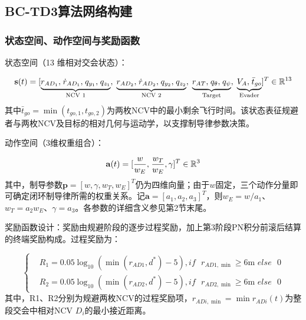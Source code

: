 \subsection{BC-TD3算法网络构建}
\subsubsection{状态空间、动作空间与奖励函数}
状态空间（13 维相对交会状态）：

\begin{equation}
\label{eq:72}
{\mathbf{s}}(t) = {[\underbrace {{r_{A{D_1}}},{\kern 1pt} {{\dot r}_{A{D_1}}},{\kern 1pt} {q_{{y_1}}},{\kern 1pt} {q_{{z_1}}}}_{{\text{NCV 1}}},\;\underbrace {{r_{A{D_2}}},{\kern 1pt} {{\dot r}_{A{D_2}}},{\kern 1pt} {q_{{y_2}}},{\kern 1pt} {q_{{z_2}}}}_{{\text{NCV 2}}},\;\underbrace {{r_{AT}},{\kern 1pt} {q_\theta },{\kern 1pt} {q_\psi }}_{{\text{Target}}},\;\underbrace {{V_A},{\kern 1pt} \bar{t}_{go}}_{{\text{Evader}}}]^T} \in {\mathbb{R}^{13}}
\end{equation}
其中$\bar{t}_{go} = \min ({t_{go,1}},{t_{go,2}})$为两枚NCV中的最小剩余飞行时间。该状态表征规避者与两枚NCV及目标的相对几何与运动学，以支撑制导律参数决策。

动作空间（3维权重组合）：

\begin{equation}
\label{eq:73}
{\mathbf{a}}(t) = {[\frac{w}{{{w_E}}},{\kern 1pt} \frac{{{w_T}}}{{{w_E}}},\gamma ]^T} \in {\mathbb{R}^3}
\end{equation}
其中，制导参数${\mathbf{p}} = {[w,\gamma ,w_T,w_E]^T}$仍为四维向量；由于$w$固定，三个动作分量即可确定闭环制导律所需的权重关系。记${\mathbf{a}} = {[a_1,a_2,a_3]^T}$，则$w_E = w/a_1$、$w_T = a_2w_E$、$\gamma = a_3$。各参数的详细含义参见第2节末尾。

奖励函数设计：奖励由规避阶段的逐步过程奖励，加上第3阶段PN积分前滚后结算的终端奖励构成。过程奖励为：

\begin{equation}
\label{eq:74}
\left\{
\begin{aligned}
& {R_1} = 0.05{\log _{10}}(\min ({r_{AD1}},{d^*}) - 5),if{\text{ }}{r_{AD1,\min }} \geqslant 6{\text{m }}else{\text{ }}0 \\
& {R_2} = 0.05{\log _{10}}(\min ({r_{AD2}},{d^*}) - 5),if{\text{ }}{r_{AD2,\min }} \geqslant 6{\text{m }}else{\text{ }}0
\end{aligned}
\right.
\end{equation}
其中，R1、R2分别为规避两枚NCV的过程奖励项，${r_{ADi,\min }} = \min {r_{ADi}}(t)$为整段交会中相对NCV ${D_i}$的最小接近距离。

